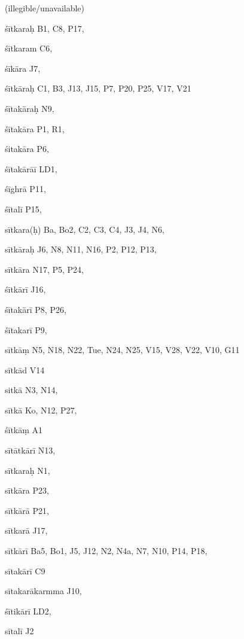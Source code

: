 \begin{ekdosis}
\begin{marma}[hp01_055]
\begin{marma}[hp02_009]
\begin{marma}[hp02_011]
\begin{marma}[hp02_55ab]
\item[]
\item[(illegible/unavailable)] 

  \begin{description}

    \end{description}
 \end{marma}

 \begin{marma}[hp02_54a]
\item[śītkaraḥ] B1, C8, P17, 
\item[śītkaram] C6,
\item[śīkāra] J7,
\item[śītkāraḥ] C1, B3, J13, J15, P7, P20, P25, V17, V21 
\item[śītakāraḥ] N9, 
\item[śītakāra] P1, R1, 
\item[śitakāra] P6, 
\item[śītakārāī] LD1, 
\item[śīghrā] P11,
\item[śītalī] P15,  
\item[sītkara(ḥ)] Ba, Bo2, C2, C3, C4, J3, J4, N6, 
\item[sītkāraḥ] J6, N8, N11, N16, P2, P12, P13, 
\item[sītkāra] N17, P5, P24, 
\item[śītkārī] J16, 
\item[śītakārī] P8, P26, 
\item[śītakarī] P9,
\item[sītkāṃ] N5, N18, N22, Tue, N24, N25, V15, V28, V22, V10, G11
\item[sītkād] V14
\item[sitkā] N3, N14, 
\item[sītkā] Ko, N12, P27, 
\item[śītkāṃ] A1
\item[sītātkārī] N13,
\item[sītkaraḥ] N1,
\item[sītkāra] P23,
\item[sītkārā] P21,
\item[sītkarā] J17, 
\item[sītkārī] Ba5, Bo1, J5, J12, N2, N4a, N7, N10, P14, P18,    
\item[sītakārī] C9
\item[sītakarākarmma] J10, 
\item[śītikārī] LD2,
\item[sītalī] J2

\end{marma}
\end{marma}
\end{marma}
\end{marma}
\end{ekdosis}
